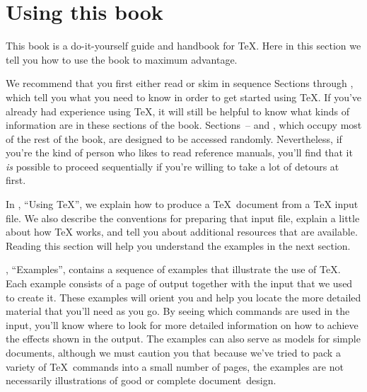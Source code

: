 

\chapter{Using this book}


This book is a do-it-yourself guide and handbook for \TeX. 
Here in this section we tell you how to use the book to maximum advantage.

We recommend that you first either read or skim in sequence Sections
 through ,
which tell you what you need to know in order to get started using \TeX.
If you've already had experience using \TeX, it will still be helpful
to know what kinds of information are in these sections of the book.
Sections~-- and
, which
occupy most of
the rest of the book, are designed to be accessed randomly.
Nevertheless, if you're the kind of person who likes to read reference manuals,
you'll find that it \emph{is} possible to proceed sequentially if you're
willing to take a lot of detours at first.

In , ``Using \TeX'',
we explain how to produce a \TeX\ document from a
\TeX{} input file.
We also describe the conventions for preparing that input file,
explain a little about how \TeX{} works, and tell you about additional
resources that are available.
Reading this section will help you understand
the examples in the next section.

, ``Examples'',
contains a sequence of 
examples that illustrate the use of \TeX.
Each example consists of a page of output
together with the input that we used to create it.
These examples will orient you and help you 
locate the more detailed material that you'll need as you go.  
By seeing which commands are used in the input, you'll know
where to look for more detailed information on how to achieve
the effects shown in the output.
The
examples can also serve as models for simple documents, although we must
caution you that 
because we've tried to pack a variety of \TeX\ commands into a small
number of pages,  
the examples are not necessarily illustrations of good or complete 
document~design.

